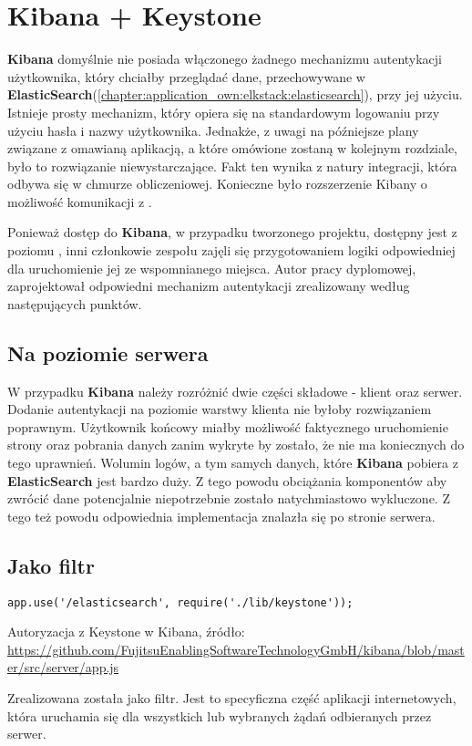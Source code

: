 \section{Kibana + Keystone}
\label{chapter:application:own_work:kibana_and_keystone}

\textbf{Kibana} domyślnie nie posiada włączonego żadnego mechanizmu autentykacji użytkownika, który
chciałby przeglądać dane, przechowywane w \textbf{ElasticSearch}(\ref{chapter:application_own:elkstack:elasticsearch}), 
przy jej użyciu. Istnieje prosty mechanizm, który opiera się na standardowym logowaniu przy użyciu
hasła i nazwy użytkownika. Jednakże, z uwagi na późniejsze plany związane z omawianą aplikacją, a które 
omówione zostaną w kolejnym rozdziale, było to rozwiązanie niewystarczające. Fakt ten wynika z natury
integracji, która odbywa się w chmurze obliczeniowej. Konieczne było rozszerzenie Kibany o możliwość
komunikacji z .

Ponieważ dostęp do \textbf{Kibana}, w przypadku tworzonego projektu, dostępny jest z poziomu , inni
członkowie zespołu zajęli się przygotowaniem logiki odpowiedniej dla uruchomienie jej ze wspomnianego miejsca. Autor pracy 
dyplomowej, zaprojektował odpowiedni mechanizm autentykacji zrealizowany według następujących punktów.

    \subsection{Na poziomie serwera}
    W przypadku \textbf{Kibana} należy rozróżnić dwie części składowe - klient oraz serwer. Dodanie autentykacji
    na poziomie warstwy klienta nie byłoby rozwiązaniem poprawnym. Użytkownik końcowy miałby możliwość faktycznego
    uruchomienie strony oraz pobrania danych zanim wykryte by zostało, że nie ma koniecznych do tego uprawnień.
    Wolumin logów, a tym samych danych, które \textbf{Kibana} pobiera z \textbf{ElasticSearch} jest bardzo duży.
    Z tego powodu obciążania komponentów aby zwrócić dane potencjalnie niepotrzebnie zostało
    natychmiastowo wykluczone. Z tego też powodu odpowiednia implementacja znalazła się po stronie serwera.
    
    \subsection{Jako filtr}
    \begin{listing}
        \begin{verbatim}
app.use('/elasticsearch', require('./lib/keystone'));
        \end{verbatim}
        \label{chapter:application_own:own_work:kibana_and_keystone:filter_code}
        \caption[Autoryzacja z Keystone w Kibana]{Autoryzacja z Keystone w Kibana, źródło: \url{https://github.com/FujitsuEnablingSoftwareTechnologyGmbH/kibana/blob/master/src/server/app.js}}
    \end{listing}
    Zrealizowana została jako filtr. Jest to specyficzna część aplikacji internetowych, która
    uruchamia się dla wszystkich lub wybranych żądań odbieranych przez serwer.
    
